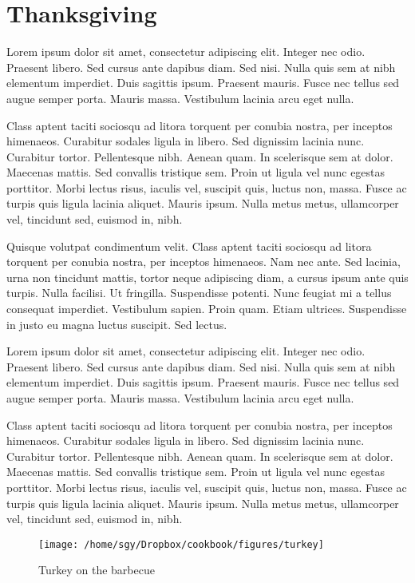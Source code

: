 \documentclass[12pt, final]{book}
\begin{document}
\chapter{Thanksgiving}\label{chapter2}

Lorem ipsum dolor sit amet, consectetur adipiscing elit. Integer nec
odio. Praesent libero. Sed cursus ante dapibus diam. Sed nisi. Nulla
quis sem at nibh elementum imperdiet. Duis sagittis ipsum. Praesent
mauris. Fusce nec tellus sed augue semper porta. Mauris
massa. Vestibulum lacinia arcu eget nulla.

Class aptent taciti sociosqu ad litora torquent per conubia nostra,
per inceptos himenaeos. Curabitur sodales ligula in libero. Sed
dignissim lacinia nunc. Curabitur tortor. Pellentesque nibh. Aenean
quam. In scelerisque sem at dolor. Maecenas mattis. Sed convallis
tristique sem. Proin ut ligula vel nunc egestas porttitor. Morbi
lectus risus, iaculis vel, suscipit quis, luctus non, massa. Fusce ac
turpis quis ligula lacinia aliquet. Mauris ipsum. Nulla metus metus,
ullamcorper vel, tincidunt sed, euismod in, nibh.


Quisque volutpat condimentum velit. Class aptent taciti sociosqu ad
litora torquent per conubia nostra, per inceptos himenaeos. Nam nec
ante. Sed lacinia, urna non tincidunt mattis, tortor neque adipiscing
diam, a cursus ipsum ante quis turpis. Nulla facilisi. Ut
fringilla. Suspendisse potenti. Nunc feugiat mi a tellus consequat
imperdiet. Vestibulum sapien. Proin quam. Etiam ultrices. Suspendisse
in justo eu magna luctus suscipit. Sed lectus.

Lorem ipsum dolor sit amet, consectetur adipiscing elit. Integer nec
odio. Praesent libero. Sed cursus ante dapibus diam. Sed nisi. Nulla
quis sem at nibh elementum imperdiet. Duis sagittis ipsum. Praesent
mauris. Fusce nec tellus sed augue semper porta. Mauris
massa. Vestibulum lacinia arcu eget nulla.

Class aptent taciti sociosqu ad litora torquent per conubia nostra,
per inceptos himenaeos. Curabitur sodales ligula in libero. Sed
dignissim lacinia nunc. Curabitur tortor. Pellentesque nibh. Aenean
quam. In scelerisque sem at dolor. Maecenas mattis. Sed convallis
tristique sem. Proin ut ligula vel nunc egestas porttitor. Morbi
lectus risus, iaculis vel, suscipit quis, luctus non, massa. Fusce ac
turpis quis ligula lacinia aliquet. Mauris ipsum. Nulla metus metus,
ullamcorper vel, tincidunt sed, euismod in, nibh.

\begin{figure}[t]
\begin{center}
\texttt{[image: /home/sgy/Dropbox/cookbook/figures/turkey]}
\end{center}
\caption*{Turkey on the barbecue}
\end{figure}
\clearpage

\newpage

\newpage

\newpage

\newpage

\newpage

\newpage


\end{document}
